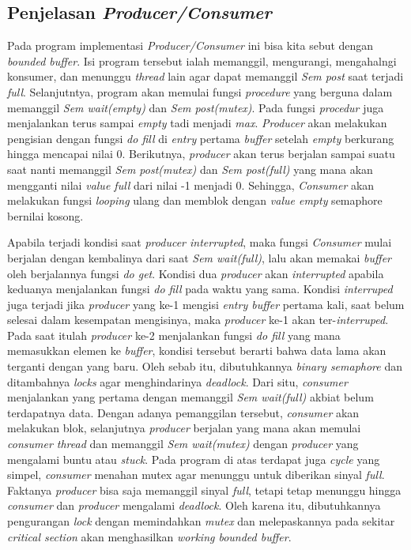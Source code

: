\documentclass[11pt,a4paper]{article}
\begin{document}
\subsection{Penjelasan \textit{Producer/Consumer}}
Pada program implementasi \textit{Producer/Consumer} ini bisa kita sebut dengan \textit{bounded buffer}. Isi program tersebut ialah memanggil, mengurangi, mengahalngi konsumer, dan menunggu \textit{thread} lain agar dapat memanggil \textit{Sem post} saat terjadi \textit{full}. 
Selanjutntya, program akan memulai fungsi \textit{procedure} yang berguna dalam memanggil \textit{Sem wait(empty)} dan \textit{Sem post(mutex)}. Pada fungsi \textit{procedur} juga menjalankan terus sampai \textit{empty} tadi menjadi \textit{max}. \textit{Producer} akan melakukan pengisian 
dengan fungsi \textit{do fill} di \textit{entry} pertama \textit{buffer} setelah \textit{empty} berkurang hingga mencapai nilai 0. Berikutnya, \textit{producer} akan terus berjalan sampai suatu saat nanti memanggil \textit{Sem post(mutex)} dan \textit{Sem post(full)} yang mana akan mengganti 
nilai \textit{value full} dari nilai -1 menjadi 0. Sehingga, \textit{Consumer} akan melakukan fungsi \textit{looping} ulang dan memblok dengan \textit{value empty} semaphore bernilai kosong. \par
Apabila terjadi kondisi saat \textit{producer interrupted}, maka fungsi \textit{Consumer} mulai berjalan dengan kembalinya dari saat \textit{Sem wait(full)}, lalu akan memakai \textit{buffer} oleh berjalannya fungsi \textit{do get}. Kondisi dua \textit{producer} akan \textit{interrupted} apabila keduanya 
menjalankan fungsi \textit{do fill} pada waktu yang sama. Kondisi \textit{interruped} juga terjadi jika \textit{producer} yang ke-1 mengisi \textit{entry buffer} pertama kali, saat belum selesai dalam kesempatan mengisinya, maka \textit{producer} ke-1 akan ter-\textit{interruped}. Pada saat itulah \textit{producer} 
ke-2 menjalankan fungsi \textit{do fill} yang mana memasukkan elemen ke \textit{buffer}, kondisi tersebut berarti bahwa data lama akan terganti dengan yang baru. Oleh sebab itu, dibutuhkannya \textit{binary semaphore} dan ditambahnya \textit{locks} agar menghindarinya \textit{deadlock}. Dari situ, \textit{consumer} 
menjalankan yang pertama dengan memanggil \textit{Sem wait(full)} akbiat belum terdapatnya data. Dengan adanya pemanggilan tersebut, \textit{consumer} akan melakukan blok, selanjutnya \textit{producer} berjalan yang mana akan memulai \textit{consumer thread} dan memanggil \textit{Sem wait(mutex)} dengan \textit{producer} 
yang mengalami buntu atau \textit{stuck}. Pada program di atas terdapat juga \textit{cycle} yang simpel, \textit{consumer} menahan mutex agar menunggu untuk diberikan sinyal \textit{full}. Faktanya \textit{producer} bisa saja memanggil sinyal \textit{full}, tetapi tetap menunggu hingga \textit{consumer} dan \textit{producer} mengalami \textit{deadlock}. Oleh karena itu, 
dibutuhkannya pengurangan \textit{lock} dengan memindahkan \textit{mutex} dan melepaskannya pada sekitar \textit{critical section} akan menghasilkan \textit{working bounded buffer}.
\end{document}
